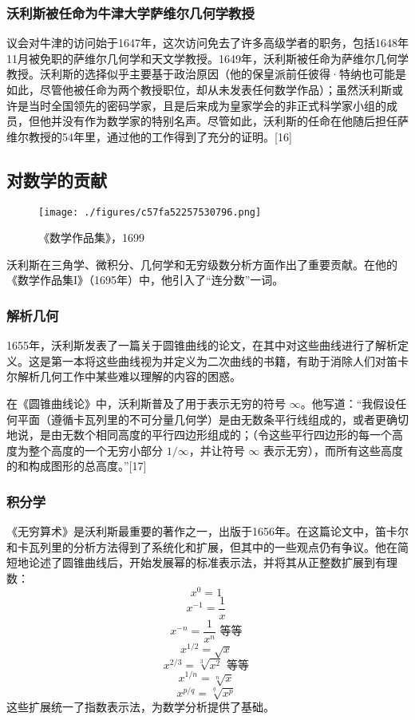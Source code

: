 \subsubsection{沃利斯被任命为牛津大学萨维尔几何学教授}
议会对牛津的访问始于1647年，这次访问免去了许多高级学者的职务，包括1648年11月被免职的萨维尔几何学和天文学教授。1649年，沃利斯被任命为萨维尔几何学教授。沃利斯的选择似乎主要基于政治原因（他的保皇派前任彼得·特纳也可能是如此，尽管他被任命为两个教授职位，却从未发表任何数学作品）；虽然沃利斯或许是当时全国领先的密码学家，且是后来成为皇家学会的非正式科学家小组的成员，但他并没有作为数学家的特别名声。尽管如此，沃利斯的任命在他随后担任萨维尔教授的54年里，通过他的工作得到了充分的证明。[16]
\subsection{对数学的贡献}
\begin{figure}[ht]
\centering
\texttt{[image: ./figures/c57fa52257530796.png]}
\caption{《数学作品集》，1699} \label{fig_YHALS_2}
\end{figure}
沃利斯在三角学、微积分、几何学和无穷级数分析方面作出了重要贡献。在他的《数学作品集I》（1695年）中，他引入了“连分数”一词。
\subsubsection{解析几何}
1655年，沃利斯发表了一篇关于圆锥曲线的论文，在其中对这些曲线进行了解析定义。这是第一本将这些曲线视为并定义为二次曲线的书籍，有助于消除人们对笛卡尔解析几何工作中某些难以理解的内容的困惑。

在《圆锥曲线论》中，沃利斯普及了用于表示无穷的符号 \(\infty\)。他写道：“我假设任何平面（遵循卡瓦列里的不可分量几何学）是由无数条平行线组成的，或者更确切地说，是由无数个相同高度的平行四边形组成的；（令这些平行四边形的每一个高度为整个高度的一个无穷小部分 \(1/\infty\)，并让符号 \(\infty\) 表示无穷），而所有这些高度的和构成图形的总高度。”[17]
\subsubsection{积分学}
《无穷算术》是沃利斯最重要的著作之一，出版于1656年。在这篇论文中，笛卡尔和卡瓦列里的分析方法得到了系统化和扩展，但其中的一些观点仍有争议。他在简短地论述了圆锥曲线后，开始发展幂的标准表示法，并将其从正整数扩展到有理数：
\[
x^0 = 1~
\]
\[
x^{-1} = \frac{1}{x}~
\]
\[
x^{-n} = \frac{1}{x^n} \text{ 等等}~
\]
\[
x^{1/2} = \sqrt{x}~
\]
\[
x^{2/3} = \sqrt[3]{x^2} \text{ 等等}~
\]
\[
x^{1/n} = \sqrt[n]{x}~
\]
\[
x^{p/q} = \sqrt[q]{x^p}~
\]
这些扩展统一了指数表示法，为数学分析提供了基础。

